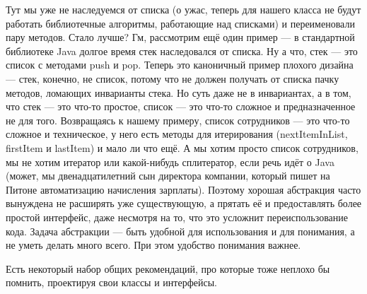 \documentclass{../../text-style}
\begin{document}
Тут мы уже не наследуемся от списка (о ужас, теперь для нашего класса не будут работать библиотечные алгоритмы, работающие над списками) и переименовали пару методов. Стало лучше? Гм, рассмотрим ещё один пример --- в стандартной библиотеке Java долгое время стек наследовался от списка. Ну а что, стек --- это список с методами push и pop. Теперь это каноничный пример плохого дизайна --- стек, конечно, не список, потому что не должен получать от списка пачку методов, ломающих инварианты стека. Но суть даже не в инвариантах, а в том, что стек --- это что-то простое, список --- это что-то сложное и предназначенное не для того. Возвращаясь к нашему примеру, список сотрудников --- это что-то сложное и техническое, у него есть методы для итерирования (nextItemInList, firstItem и lastItem) и мало ли что ещё. А мы хотим просто список сотрудников, мы не хотим итератор или какой-нибудь сплитератор, если речь идёт о Java (может, мы двенадцатилетний сын директора компании, который пишет на Питоне автоматизацию начисления зарплаты). Поэтому хорошая абстракция часто вынуждена не расширять уже существующую, а прятать её и предоставлять более простой интерфейс, даже несмотря на то, что это усложнит переиспользование кода. Задача абстракции --- быть удобной для использования и для понимания, а не уметь делать много всего. При этом удобство понимания важнее.

Есть некоторый набор общих рекомендаций, про которые тоже неплохо бы помнить, проектируя свои классы и интерфейсы.
\end{document}
